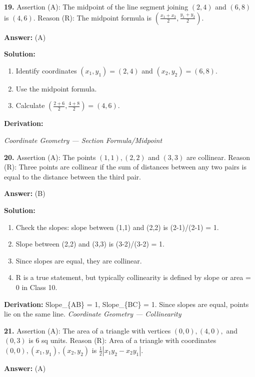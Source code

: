 \documentclass[12pt,a4paper]{exam}
\newcommand{\fitmath}[1]{%
  \sbox{\schmathbox}{$\displaystyle #1$}%
  \ifdim\wd\schmathbox>\linewidth
    \resizebox{\linewidth}{!}{\usebox{\schmathbox}}%
  \else
    \usebox{\schmathbox}%
  \fi}
\begin{document}
\begin{questions}
\question \textbf{19.} Assertion (A): The midpoint of the line segment joining $(2, 4)$ and $(6, 8)$ is $(4, 6)$. Reason (R): The midpoint formula is $(\frac{x_1+x_2}{2}, \frac{y_1+y_2}{2})$.

\textbf{Answer:}
(A)

\textbf{Solution:}
\begin{enumerate}
  \item Identify coordinates $(x_1, y_1) = (2, 4)$ and $(x_2, y_2) = (6, 8)$.
  \item Use the midpoint formula.
  \item Calculate $(\frac{2+6}{2}, \frac{4+8}{2}) = (4, 6)$.
\end{enumerate}
\textbf{Derivation:}
\begin{center}
\fitmath{M = (\frac{2+6}{2}, \frac{4+8}{2}) = (\frac{8}{2}, \frac{12}{2}) = (4, 6)}
\end{center}
\hfill \textit{Coordinate Geometry — Section Formula/Midpoint}
\vspace{0.3cm}

\question \textbf{20.} Assertion (A): The points $(1, 1), (2, 2)$ and $(3, 3)$ are collinear. Reason (R): Three points are collinear if the sum of distances between any two pairs is equal to the distance between the third pair.

\textbf{Answer:}
(B)

\textbf{Solution:}
\begin{enumerate}
  \item Check the slopes: slope between (1,1) and (2,2) is (2-1)/(2-1) = 1.
  \item Slope between (2,2) and (3,3) is (3-2)/(3-2) = 1.
  \item Since slopes are equal, they are collinear.
  \item R is a true statement, but typically collinearity is defined by slope or area = 0 in Class 10.
\end{enumerate}
\textbf{Derivation:}
Slope\_\{AB\} = 1, Slope\_\{BC\} = 1. Since slopes are equal, points lie on the same line.
\hfill \textit{Coordinate Geometry — Collinearity}
\vspace{0.3cm}

\question \textbf{21.} Assertion (A): The area of a triangle with vertices $(0, 0), (4, 0),$ and $(0, 3)$ is $6$ sq units. Reason (R): Area of a triangle with coordinates $(0, 0), (x_1, y_1), (x_2, y_2)$ is $\frac{1}{2}|x_1y_2 - x_2y_1|$.

\textbf{Answer:}
(A)


\end{questions}
\end{document}
